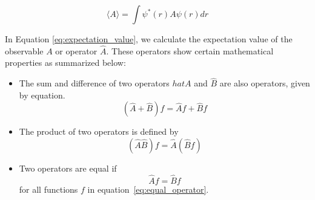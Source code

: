 \begin{equation}
\langle A \rangle = \int \psi^{*}(r) A \psi(r) dr
\label{eq:expectation_value}
\end{equation}

In Equation \ref{eq:expectation_value}, we calculate the expectation value of the observable $A$ or operator $\hat{A}$. These operators show certain mathematical properties as summarized below:

\begin{itemize}
    \item The sum and difference of two operators $hat{A}$ and $\hat{B}$ are also operators, given by equation.
        \begin{equation}
            (\hat{A} + \hat{B})f = \hat{A}f + \hat{B}f
            \label{eq:sum_diff_operator}
        \end{equation}
    \item The product of two operators is defined by 
        \begin{equation}
            (\hat{A}\hat{B})f = \hat{A}(\hat{B}f)
            \label{eq:product_operator}
        \end{equation}

    \item Two operators are equal if 
        \begin{equation}
            \hat{A}f = \hat{B}f
            \label{eq:equal_operator}
        \end{equation}
        for all functions $f$ in equation~\ref{eq:equal_operator}.


\end{itemize}
